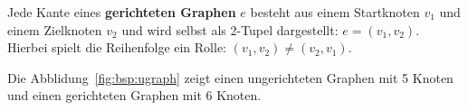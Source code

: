 \begin{mdef}
Jede Kante eines \textbf{gerichteten Graphen} $e$ besteht aus einem Startknoten $v_1$ und einem Zielknoten $v_2$ und wird selbst als 2-Tupel dargestellt: $e= (v_1,v_2)$. 
Hierbei spielt die Reihenfolge ein Rolle: $(v_1,v_2) \neq (v_2,v_1)$. 
\end{mdef}


\begin{mbsp}
Die Abblidung~\ref{fig:bsp:ugraph} zeigt einen ungerichteten Graphen mit 5 Knoten und einen gerichteten Graphen mit 6 Knoten. 
\end{mbsp}

